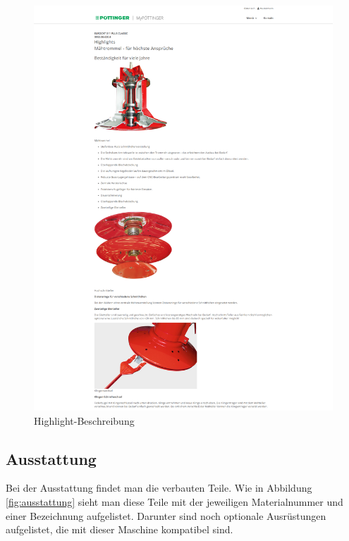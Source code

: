 \begin{figure}[H]
	\centerline{
		\includegraphics[width=1\textwidth, frame]{./grafiken/erm_detailansicht_highlights_beschreibung.PNG}
	}
	\vskip0pt
	\caption{Highlight-Beschreibung} \label{fig:highlightbeschreibung}
\end{figure}

\newpage

\subsection{Ausstattung}

Bei der Ausstattung findet man die verbauten Teile. Wie in Abbildung \ref{fig:ausstattung} sieht man diese Teile mit der jeweiligen Materialnummer und einer Bezeichnung aufgelistet. Darunter sind noch optionale Ausrüstungen aufgelistet, die mit dieser Maschine kompatibel sind.

